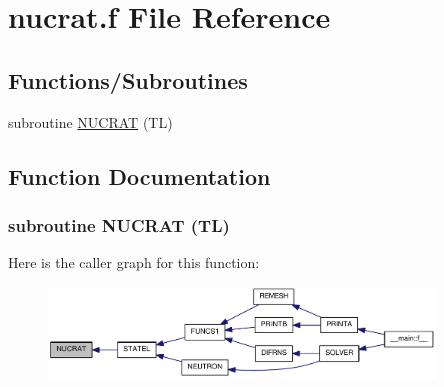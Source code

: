 \hypertarget{nucrat_8f}{
\section{nucrat.f File Reference}
\label{nucrat_8f}
}
\subsection*{Functions/Subroutines}
\begin{DoxyCompactItemize}
\item 
subroutine \hyperlink{nucrat_8f_a98080f8c775d473d25fea4a1ccdd865a}{NUCRAT} (TL)
\end{DoxyCompactItemize}


\subsection{Function Documentation}
\hypertarget{nucrat_8f_a98080f8c775d473d25fea4a1ccdd865a}{
\subsubsection[{NUCRAT}]{\setlength{\rightskip}{0pt plus 5cm}subroutine NUCRAT (TL)}}
\label{nucrat_8f_a98080f8c775d473d25fea4a1ccdd865a}


Here is the caller graph for this function:\nopagebreak
\begin{figure}[H]
\begin{center}
\leavevmode
\includegraphics[width=291pt]{nucrat_8f_a98080f8c775d473d25fea4a1ccdd865a_icgraph}
\end{center}
\end{figure}
